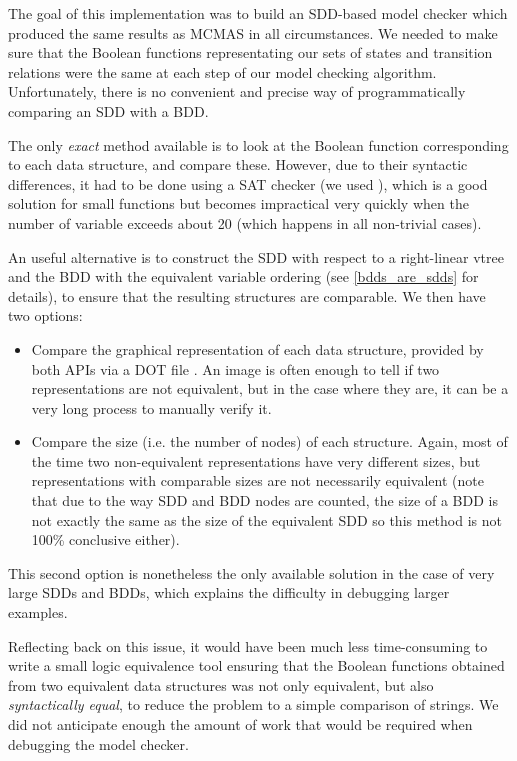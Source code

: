 \documentclass[11pt]{article}
\begin{document}
The goal of this implementation was to build an SDD-based model checker which produced the same results as MCMAS in all circumstances. We needed to make sure that the Boolean functions representating our sets of states and transition relations were the same at each step of our model checking algorithm. Unfortunately, there is no convenient and precise way of programmatically comparing an SDD with a BDD. 

The only \textit{exact} method available is to look at the Boolean function corresponding to each data structure, and compare these. However, due to their syntactic differences, it had to be done using a SAT checker (we used \cite{minisat}), which is a good solution for small functions but becomes impractical very quickly when the number of variable exceeds about 20 (which happens in all non-trivial cases).  

An useful alternative is to construct the SDD with respect to a right-linear vtree and the BDD with the equivalent variable ordering (see \ref{bdds_are_sdds} for details), to ensure that the resulting structures are comparable. We then have two options:
\begin{itemize}

\item Compare the graphical representation of each data structure, provided by both APIs via a DOT file \cite{dot}. An image is often enough to tell if two representations are not equivalent, but in the case where they are, it can be a very long process to manually verify it.
\item Compare the size (i.e. the number of nodes) of each structure. Again, most of the time two non-equivalent representations have very different sizes, but representations with comparable sizes are not necessarily equivalent (note that due to the way SDD and BDD nodes are counted, the size of a BDD is not exactly the same as the size of the equivalent SDD so this method is not 100\% conclusive either).

\end{itemize}
 This second option is nonetheless the only available solution in the case of very large SDDs and BDDs, which explains the difficulty in debugging larger examples.

Reflecting back on this issue, it would have been much less time-consuming to write a small logic equivalence tool ensuring that the Boolean functions obtained from two equivalent data structures was not only equivalent, but also \textit{syntactically equal}, to reduce the problem to a simple comparison of strings. We did not anticipate enough the amount of work that would be required when debugging the model checker.
\end{document}
